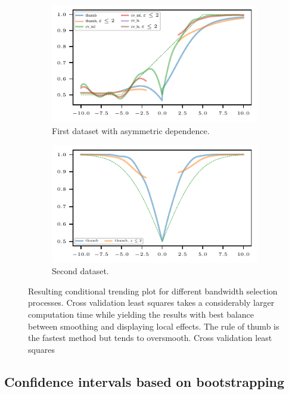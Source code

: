 \begin{figure}
    \centering
    \begin{subfigure}{.48\textwidth}
        \includegraphics{plots/illustrative_examples/cond_prob_plot_bw_asym_butterfly}
        \caption{First dataset with asymmetric dependence.}
    \end{subfigure}
    \begin{subfigure}{.48\textwidth}
        \includegraphics{plots/illustrative_examples/cond_prob_plot_bw_normal}
        \caption{Second dataset. }
    \end{subfigure}
    \caption{Resulting conditional trending plot for different bandwidth selection processes. Cross validation least squares takes a considerably larger computation time while yielding the results with best balance between smoothing and displaying local effects. The rule of thumb is the fastest method but tends to oversmooth. Cross validation least squares  }\label{fig:trending-cond-prob-bw}
\end{figure}


\subsection{Confidence intervals based on bootstrapping}\label{subsec:trending-bootstrap}

